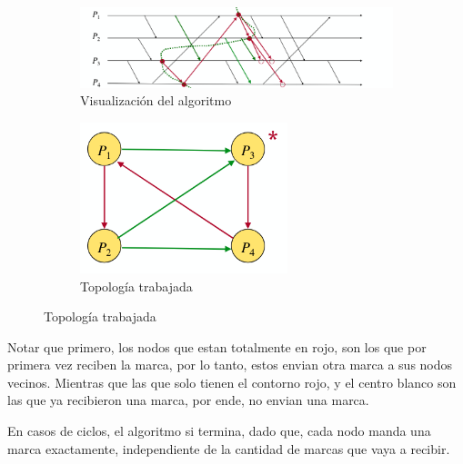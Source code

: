\begin{figure}[H]
  \centering
  \captionsetup[subfigure]{labelformat=empty}
  \begin{subfigure}[b]{0.3\textwidth}
    \includegraphics[width=\textwidth]{img/Chandy_ver.png}
    \caption{Visualización del algoritmo}
  \end{subfigure}
  \hspace{2mm} %
  \begin{subfigure}[b]{0.2\textwidth}
    \includegraphics[width=\textwidth]{img/Topologia.png}
    \caption{Topología trabajada}
  \end{subfigure}
  \label{fig:imagenes_lado_a_lado}
\end{figure}
Notar que primero, los nodos que estan totalmente en rojo, son los que por primera vez reciben la marca, por lo tanto, estos envian otra marca a sus nodos vecinos. Mientras que las que solo tienen el contorno rojo, y el centro blanco son las que ya recibieron una marca, por ende, no envian una marca.

En casos de ciclos, el algoritmo si termina, dado que, cada nodo manda una marca exactamente, independiente de la cantidad de marcas que vaya a recibir. 

